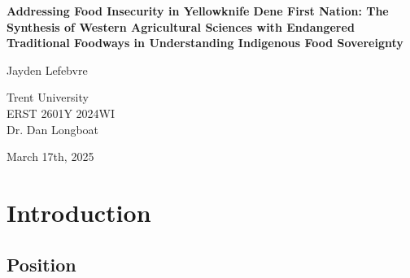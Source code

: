 \documentclass{report}
\begin{document}
\begin{titlepage}
    \begin{center}
        \vspace*{1.2cm}

        \textbf{Addressing Food Insecurity in Yellowknife Dene First Nation: The Synthesis of Western Agricultural Sciences with Endangered Traditional Foodways in Understanding Indigenous Food Sovereignty}

        \vspace{2cm}

        Jayden Lefebvre\\

        \vspace{5cm}
        
        Trent University\\
        ERST 2601Y 2024WI\\
        Dr. Dan Longboat\\

        \vfill

        March 17th, 2025
        
    \end{center}
\end{titlepage}

\thispagestyle{plain}
\tableofcontents

\clearpage

\section{Introduction}

\subsection{Position}


\end{document}
